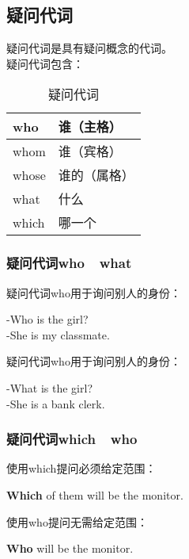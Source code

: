 \documentclass[UTF8]{ctexart}
\newcommand{\littf}[1]{{\hspace{3pt}\ttfamily #1}}
\begin{document}
\subsection{疑问代词}
    疑问代词是具有疑问概念的代词。\\[3mm]
    疑问代词包含：
    \begin{table}[h]
        \begin{center}
            \ttfamily
            \begin{tabular}{p{70pt}|p{70pt}}
                \hline
                who&谁（主格）\\ \hline
                whom&谁（宾格）\\ \hline
                whose&谁的（属格）\\ \hline
                what&什么\\ \hline
                which&哪一个\\ \hline
            \end{tabular}
            \rmfamily
            \caption{疑问代词}
        \end{center}
    \end{table}\vspace{-25pt}

\subsubsection{疑问代词\littf{who}~~\littf{what}}
    疑问代词\littf{who}用于询问别人的身份：
    \begin{center}
        \large\ttfamily
        -Who is the girl?\hphantom{xxxx}\\[2mm]
        -She is my classmate.\\[4mm]
    \end{center}
    疑问代词\littf{who}用于询问别人的身份：
    \begin{center}
        \large\ttfamily
        -What is the girl?\hphantom{xxx}\\[2mm]
        -She is a bank clerk.\\[4mm]
    \end{center}

\subsubsection{疑问代词\littf{which}~~\littf{who}}
    使用\littf{which}提问必须给定范围：
    \begin{center}
        \large\ttfamily
        \textbf{Which} of them will be the monitor.\\[4mm]
    \end{center}
    使用\littf{\hphantom{x}who\hphantom{x}}提问无需给定范围：
    \begin{center}
        \large\ttfamily
        \textbf{Who} will be the monitor.
    \end{center}
\end{document}
